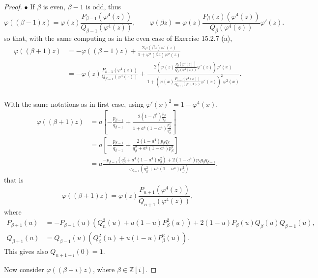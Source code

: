 \documentclass[11pt,a4paper]{article}
\newcommand{\Z}{\mathbb{Z}}
\begin{document}
\begin{proof}
\bigskip 

$\bullet$ If $\beta$ is even, $\beta - 1$ is odd, thus
$$
\varphi((\beta - 1)z) = \varphi(z)\frac{P_{\beta - 1}\left(\varphi^4(z)\right)}{Q_{\beta - 1}\left(\varphi^4(z)\right)}, \qquad \varphi(\beta z) = \varphi(z)\frac{P_{\beta}(z)\left(\varphi^4(z)\right)}{Q_{\beta}\left(\varphi^4(z)\right)} \varphi'(z).
$$
so that, with the same computing as in the even case of Exercise 15.2.7 (a),
\begin{align*}
\varphi\left((\beta + 1)z\right) &= - \varphi\left( (\beta - 1)z \right) + \frac{2 \varphi(\beta z) \varphi'(z)}{1+\varphi^2(\beta z) \varphi^2(z)}\\
&=- \varphi(z) \frac{P_{\beta - 1}\left(\varphi^4(z)\right)}{Q_{\beta - 1}\left(\varphi^4(z)\right)} + \frac{2 \left(\varphi(z)\frac{P_{\beta}\left(\varphi^4(z)\right)}{Q_{\beta}\left(\varphi^4(z)\right)} \varphi'(z) \right) \varphi'(x)}{1+\left(\varphi(x)\frac{P_{n+i}\left(\varphi^4(x)\right)}{Q_{n+i}\left(\varphi^4(x)\right)} \varphi'(x) \right)^2 \varphi^2(x)}.\\
\end{align*}

With the same notations as in first case, using $\varphi'(x)^2 = 1 - \varphi^4(x)$,
\begin{align*}
\varphi\left((\beta + 1)z\right) &= a \left[ -\frac{p_{\beta-1}}{q_{\beta-1}} + \frac{2 (1-\beta^4)\frac{p_\beta}{q_\beta} }{1 + a^4(1-a^4) \frac{p_\beta^2}{q_\beta^2}} \right] \\
&=a \left[  -\frac{p_{\beta-1}}{q_{\beta-1}} + \frac{2(1-a^4)p_\beta q_\beta}{q_\beta^2+a^4(1-a^4)p_\beta^2}\right] \\
&=a \frac {-p_{\beta-1}(q_\beta^2 + a^4(1-a^4) p_\beta^2) + 2(1-a^4) p_\beta q_\beta q_{\beta-1}}{q_{\beta-1}(q_\beta^2 + a^4(1-a^4)p_\beta^2)},
\end{align*}
that is
$$\varphi\left((\beta + 1)z\right) = \varphi(z) \frac{P_{n+1}(\varphi^4(z))}{Q_{n+1}(\varphi^4(z))},$$
where
\begin{align*}
P_{\beta + 1}(u) &= -P_{\beta - 1}(u) (Q_n^2(u) + u(1-u) P_{\beta}^2(u)) + 2(1-u) P_{\beta}(u)Q_{\beta}(u) Q_{\beta - 1}(u),\\
Q_{\beta + 1}(u) &=Q_{\beta - 1}(u)(Q_{\beta}^2(u) + u(1-u) P_{\beta}^2(u)).
\end{align*}
This gives also $Q_{n+1+i}(0) = 1$. 

\bigskip

Now consider $\varphi((\beta + i)z)$, where $\beta \in \Z[i]$.


\end{proof}
\end{document}
